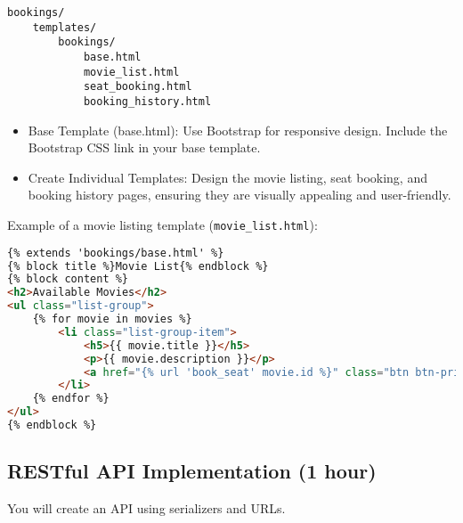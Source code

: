 \documentclass{article}
\begin{document}
\begin{verbatim}
bookings/
    templates/
        bookings/
            base.html
            movie_list.html
            seat_booking.html
            booking_history.html
\end{verbatim}

\begin{itemize}
    \item Base Template (base.html): Use Bootstrap for responsive design. Include the Bootstrap CSS link in your base template.

    \item Create Individual Templates: Design the movie listing, seat booking, and booking history pages, ensuring they are visually appealing and user-friendly.

\end{itemize}
\begin{minipage}{\textwidth}
Example of a movie listing template (\texttt{movie\_list.html}):
\begin{lstlisting}[style=customcode,language=html]
{% extends 'bookings/base.html' %}
{% block title %}Movie List{% endblock %}
{% block content %}
<h2>Available Movies</h2>
<ul class="list-group">
    {% for movie in movies %}
        <li class="list-group-item">
            <h5>{{ movie.title }}</h5>
            <p>{{ movie.description }}</p>
            <a href="{% url 'book_seat' movie.id %}" class="btn btn-primary">Book Now</a>
        </li>
    {% endfor %}
</ul>
{% endblock %}
\end{lstlisting}
\end{minipage}

\subsection{RESTful API Implementation (1 hour)}
You will create an API using serializers and URLs. 
\end{document}
